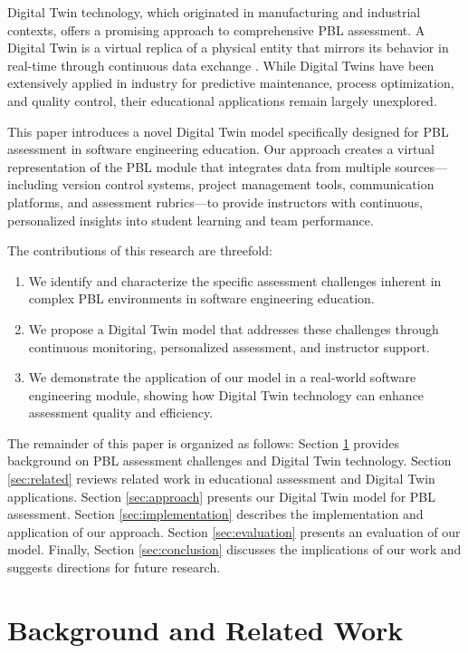 \documentclass[review]{elsarticle}
\begin{document}
Digital Twin technology, which originated in manufacturing and industrial contexts, offers a promising approach to comprehensive PBL assessment. A Digital Twin is a virtual replica of a physical entity that mirrors its behavior in real-time through continuous data exchange \cite{grieves2014}. While Digital Twins have been extensively applied in industry for predictive maintenance, process optimization, and quality control, their educational applications remain largely unexplored.

This paper introduces a novel Digital Twin model specifically designed for PBL assessment in software engineering education. Our approach creates a virtual representation of the PBL module that integrates data from multiple sources—including version control systems, project management tools, communication platforms, and assessment rubrics—to provide instructors with continuous, personalized insights into student learning and team performance.

The contributions of this research are threefold:
\begin{enumerate}
    \item We identify and characterize the specific assessment challenges inherent in complex PBL environments in software engineering education.
    \item We propose a Digital Twin model that addresses these challenges through continuous monitoring, personalized assessment, and instructor support.
    \item We demonstrate the application of our model in a real-world software engineering module, showing how Digital Twin technology can enhance assessment quality and efficiency.
\end{enumerate}

The remainder of this paper is organized as follows: Section \ref{sec:background} provides background on PBL assessment challenges and Digital Twin technology. Section \ref{sec:related} reviews related work in educational assessment and Digital Twin applications. Section \ref{sec:approach} presents our Digital Twin model for PBL assessment. Section \ref{sec:implementation} describes the implementation and application of our approach. Section \ref{sec:evaluation} presents an evaluation of our model. Finally, Section \ref{sec:conclusion} discusses the implications of our work and suggests directions for future research.

\section{Background and Related Work}
\label{sec:background}
\end{document}
